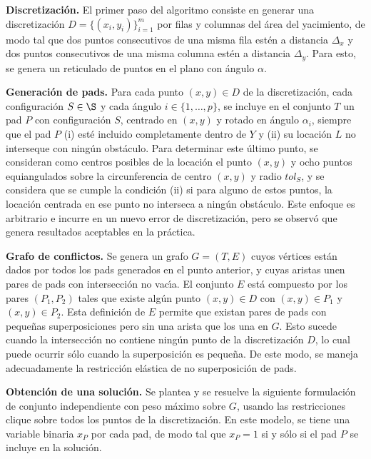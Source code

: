 \noindent\textbf{Discretizaci\'on.} El primer paso del algoritmo consiste en generar una discretizaci\'on $D=\{(x_i,y_i)\}_{i=1}^m$ por filas y columnas del \'area del yacimiento, de modo tal que dos puntos consecutivos de una misma fila est\'en a distancia $\Delta_x$ y dos puntos consecutivos de una misma columna est\'en a distancia $\Delta_y$. Para esto, se genera un reticulado de puntos en el plano con \'angulo $\alpha$.


\noindent\textbf{Generaci\'on de pads.} Para cada punto $(x,y)\in D$ de la discretizaci\'on, cada configuraci\'on $S\in\S$ y cada \'angulo $i\in\{1,\dots,p\}$, se incluye en el conjunto $T$ un pad $P$ con configuraci\'on $S$, centrado en $(x,y)$ y rotado en \'angulo $\alpha_i$, siempre que el pad $P$ (i) est\'e incluido completamente dentro de $Y$ y (ii) su locaci\'on $L$ no interseque con ning\'un obst\'aculo. Para determinar este \'ultimo punto, se consideran como centros posibles de la locaci\'on el punto $(x,y)$ y ocho puntos equiangulados sobre la circunferencia de centro $(x,y)$ y radio $tol_S$, y se considera que se cumple la condici\'on (ii) si para alguno de estos puntos, la locaci\'on centrada en ese punto no interseca a ning\'un obst\'aculo. Este enfoque es arbitrario e incurre en un nuevo error de discretizaci\'on, pero se observ\'o que genera resultados aceptables en la pr\'actica.


\noindent\textbf{Grafo de conflictos.} Se genera un grafo $G=(T,E)$ cuyos v\'ertices est\'an dados por todos los pads generados en el punto anterior, y cuyas aristas unen pares de pads con intersecci\'on no vac\'\i a. El conjunto $E$ est\'a compuesto por los pares $(P_1,P_2)$ tales que existe alg\'un punto $(x,y)\in D$ con $(x,y)\in P_1$ y $(x,y)\in P_2$. Esta definici\'on de $E$ permite que existan pares de pads con peque\~nas superposiciones pero sin una arista que los una en $G$. Esto sucede cuando la intersecci\'on no contiene ning\'un punto de la discretizaci\'on $D$, lo cual puede ocurrir s\'olo cuando la superposici\'on es peque\~na. De este modo, se maneja adecuadamente la restricci\'on el\'astica de no superposici\'on de pads.

\noindent\textbf{Obtenci\'on de una soluci\'on.} Se plantea y se resuelve la siguiente formulaci\'on de conjunto independiente con peso m\'aximo sobre $G$, usando las restricciones clique sobre todos los puntos de la discretizaci\'on. En este modelo, se tiene una variable binaria $x_P$ por cada pad, de modo tal que $x_P=1$ si y s\'olo si el pad $P$ se incluye en la soluci\'on.


